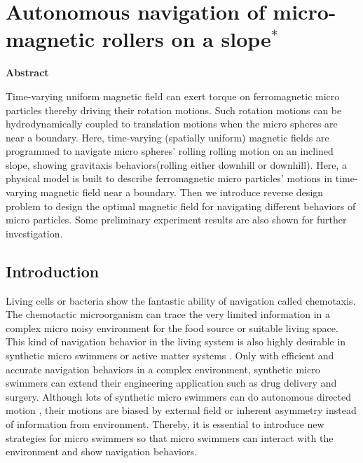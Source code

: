 \chapter{Autonomous navigation of micro-magnetic rollers on a slope$^{*}$} 
\begin{center}
\vspace*{1\baselineskip}
\textbf{Abstract}
\end{center}
Time-varying uniform magnetic field can exert torque on ferromagnetic micro particles thereby driving their rotation motions. Such rotation motions can be hydrodynamically coupled to translation motions when the micro spheres are near a boundary. Here, time-varying (spatially uniform) magnetic fields are  programmed to navigate micro spheres' rolling rolling motion on an inclined slope, showing gravitaxis behaviors(rolling either downhill or downhill). Here, a physical model is  built  to describe ferromagnetic micro particles' motions in time-varying magnetic field near a boundary. Then we introduce reverse design problem to design the optimal magnetic field for navigating different behaviors of micro particles. Some preliminary experiment results are also shown for further investigation. 
\section{Introduction}
Living cells or bacteria show the fantastic ability of navigation called chemotaxis\autocite{alon1999robustness,adler1975chemotaxis}. The chemotactic microorganism can trace the very limited information in  a complex micro noisy environment for the food source or suitable living space\autocite{keller1971model}. This kind of navigation behavior in the living system is also highly desirable in synthetic micro swimmers or active matter systems \autocite{patteson2016active}. Only with efficient and accurate navigation behaviors in a complex environment, synthetic micro swimmers can extend their engineering application  such as drug delivery and surgery\autocite{de2017micromotor,xu2018sperm}. Although lots of synthetic  micro swimmers can do autonomous directed motion \autocite{yan2016reconfiguring,dou2016,lee2019directed,baker2019shape}, their motions are biased by  external field or inherent asymmetry instead of information from environment. Thereby, it is essential to introduce new strategies for micro swimmers so that micro swimmers can interact with the environment and show navigation behaviors.  

